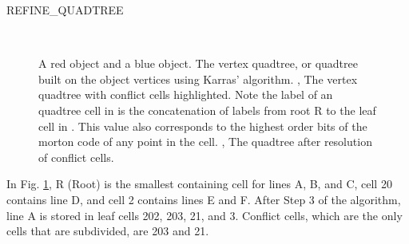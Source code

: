 \documentclass[submission]{gmp2017}
\begin{document}
\algorithmspace
\begin{algorithm}
  \DontPrintSemicolon
  \LinesNumbered
  \BlankLine
\caption{REFINE\_QUADTREE}
\label{alg:refine-quadtree}
\end{algorithm}
\algorithmspace

\begin{figure}
  \centering
   \\
  \caption{
    \protect{} A red object and a blue object.
    \protect{} The vertex quadtree, or quadtree built on the object vertices using Karras' algorithm.
    \protect{}, \protect{} The vertex quadtree with conflict cells highlighted. Note the label of an quadtree cell in \protect{} is the concatenation of labels from root R to the leaf cell in \protect{}. This value also corresponds to the highest order bits of the morton code of any point in the cell.
    \protect{}, \protect{} The quadtree after resolution of conflict cells.
  }
  \label{fig:steps}
\end{figure}

In Fig. \ref{fig:steps}, R (Root) is the smallest containing cell for lines A, B, and C, cell 20 contains line D, and cell 2 contains lines E and F. After Step 3 of the algorithm, line A is stored in leaf cells 202, 203, 21, and 3. Conflict cells, which are the only cells that are subdivided, are 203 and 21.
\end{document}
